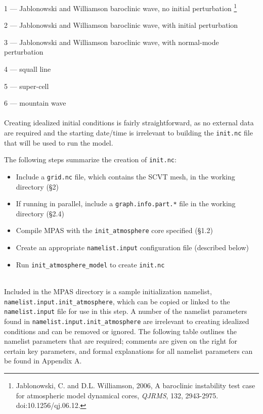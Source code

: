 1 --- Jablonowski and Williamson baroclinic wave, no initial perturbation
\footnote{Jablonowski, C. and D.L. Williamson, 2006, A baroclinic instability test case for atmospheric model dynamical cores, {\em QJRMS}, 132, 2943-2975. doi:10.1256/qj.06.12.}

2 --- Jablonowski and Williamson baroclinic wave, with initial perturbation

3 --- Jablonowski and Williamson baroclinic wave, with normal-mode perturbation

4 --- squall line

5 --- super-cell

6 --- mountain wave\\
\\
Creating idealized initial conditions is fairly straightforward, as no external data are required and the starting date/time is irrelevant to building the {\tt init.nc} file that will be used to run the model.

The following steps summarize the creation of {\tt init.nc}:

\begin{itemize}
\item Include a {\tt grid.nc} file, which contains the SCVT mesh, in the working directory (\S 2)
\item If running in parallel, include a {\tt graph.info.part.*} file in the working directory (\S 2.4)
\item Compile MPAS with the {\tt init\_atmosphere} core specified (\S 1.2)
\item Create an appropriate {\tt namelist.input} configuration file (described below)
\item Run {\tt init\_atmosphere\_model} to create {\tt init.nc}
\end{itemize}~\\

Included in the MPAS directory is a sample initialization namelist, {\tt namelist.input.init\_atmosphere}, which can be copied or linked to the {\tt namelist.input} file for use in this step.  A number of the namelist parameters found in {\tt namelist.input.init\_atmosphere} are irrelevant to creating idealized conditions and can be removed or ignored.  The following table outlines the namelist parameters that are required; comments are given on the right for certain key parameters, and formal explanations for all namelist parameters can be found in Appendix A.


